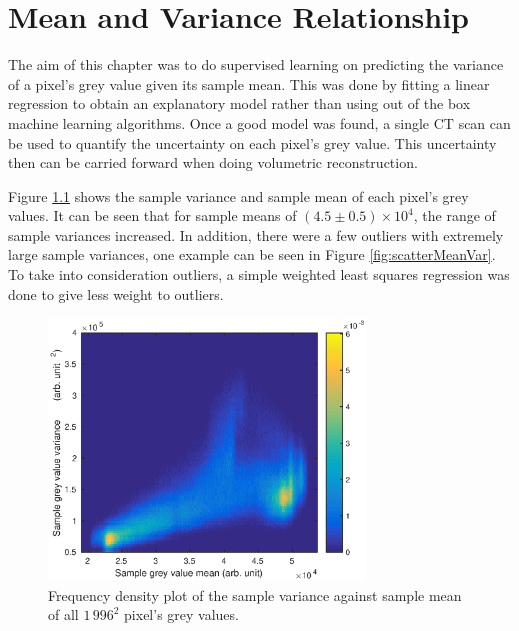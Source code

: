 \documentclass[12pt]{report}
\begin{document}

\chapter{Mean and Variance Relationship}

The aim of this chapter was to do supervised learning on predicting the variance of a pixel's grey value given its sample mean. This was done by fitting a linear regression to obtain an explanatory model rather than using out of the box machine learning algorithms. Once a good model was found, a single CT scan can be used to quantify the uncertainty on each pixel's grey value. This uncertainty then can be carried forward when doing volumetric reconstruction.

Figure \ref{fig:histogramHeatmap} shows the sample variance and sample mean of each pixel's grey values. It can be seen that for sample means of $(4.5\pm0.5)\times 10^4$, the range of sample variances increased. In addition, there were a few outliers with extremely large sample variances, one example can be seen in Figure \ref{fig:scatterMeanVar}. To take into consideration outliers, a simple weighted least squares regression was done to give less weight to outliers.

\begin{figure}
	\centering
	\includegraphics[width=0.75\textwidth]{figures/meanVar/histogramHeatmap.eps}
	\caption{Frequency density plot of the sample variance against sample mean of all $1\,996^2$ pixel's grey values.}
	\label{fig:histogramHeatmap}
\end{figure}
\end{document}
